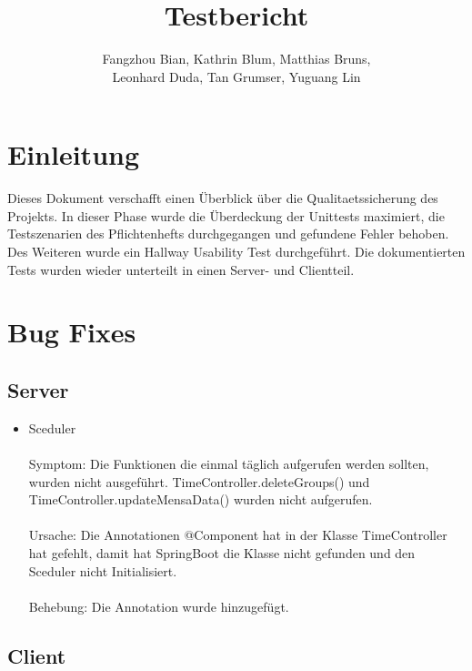 \documentclass[a4paper]{scrreprt}
\begin{document}
\title{Testbericht}
\author{Fangzhou Bian, Kathrin Blum, Matthias Bruns, \\Leonhard Duda, Tan Grumser, Yuguang Lin}
\maketitle
\tableofcontents



\chapter{Einleitung}

Dieses Dokument verschafft einen Überblick über die \Gls{Qualitaetssicherung} des Projekts. In dieser Phase wurde die Überdeckung der \Gls{Unittest}s maximiert, die Testszenarien des Pflichtenhefts durchgegangen und gefundene Fehler behoben. Des Weiteren wurde ein \Gls{Hallway Usability Test} durchgeführt. Die dokumentierten Tests wurden wieder unterteilt in einen Server- und Clientteil.

\chapter{Bug Fixes}
\section{Server}

\begin{itemize}
\item Sceduler\\ \\
Symptom: Die Funktionen die einmal täglich aufgerufen werden sollten, wurden nicht ausgeführt. TimeController.deleteGroups() und TimeController.updateMensaData() wurden nicht aufgerufen.\\ \\
Ursache: Die Annotationen @Component hat in der Klasse TimeController hat gefehlt, damit hat SpringBoot die Klasse nicht gefunden und den Sceduler nicht Initialisiert.\\ \\
Behebung:  Die Annotation wurde hinzugefügt.
\end{itemize}

\section{Client}
\end{document}

